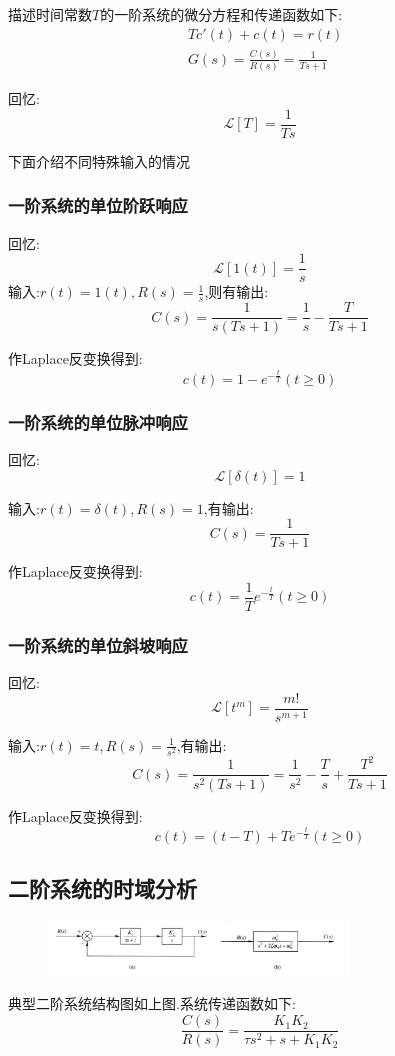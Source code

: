 \documentclass[12pt,a4paper,oneside]{ctexart}
\begin{document}
描述时间常数$T$的一阶系统的微分方程和传递函数如下:
\begin{align*}
    &Tc'(t)+c(t)=r(t)\\
    &G(s)=\frac{C(s)}{R(s)}=\frac{1}{Ts+1}
\end{align*}

回忆:
\[
    \mathcal{L}[T] = \frac{1}{Ts}
\]

下面介绍不同特殊输入的情况

\subsubsection{一阶系统的单位阶跃响应}
回忆:\[\mathcal{L}[1(t)] = \frac{1}{s}\]
输入:$r(t)=1(t),R(s)=\frac{1}{s}$,则有输出:
\[
    C(s)=\frac{1}{s(Ts+1)}=\frac{1}{s} - \frac{T}{Ts+1}
\]

作Laplace反变换得到:
\[
    c(t)=1-e^{-\frac{t}{T}}(t\geqslant 0)
\]

\subsubsection{一阶系统的单位脉冲响应}
回忆:\[\mathcal{L}[\delta(t)]=1\]

输入:$r(t)=\delta(t),R(s)=1$,有输出:
\[
    C(s)=\frac{1}{Ts+1}
\]

作Laplace反变换得到:
\[
    c(t)=\frac{1}{T}e^{-\frac{t}{T}}(t\geqslant 0)
\]

\subsubsection{一阶系统的单位斜坡响应}
回忆:\[\mathcal{L}[t^m]=\frac{m!}{s^{m+1}}\]

输入:$r(t)=t,R(s)=\frac{1}{s^2}$,有输出:
\[
    C(s)=\frac{1}{s^2(Ts+1)}=\frac{1}{s^2}-\frac{T}{s}+\frac{T^2}{Ts+1}
\]

作Laplace反变换得到:
\[
    c(t)=(t-T)+Te^{-\frac{t}{T}}(t\geqslant 0)
\]

\subsection{二阶系统的时域分析}
\begin{figure}[H]
    \centering
    \includegraphics[width=8cm]{photos/二阶系统结构图.png}
\end{figure}
典型二阶系统结构图如上图.系统传递函数如下:
\[
    \frac{C(s)}{R(s)}=\frac{K_1K_2}{\tau s^2+s+K_1K_2}
\]
\end{document}
